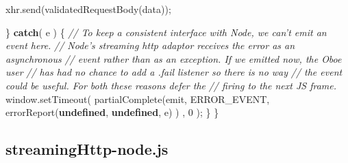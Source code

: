 \documentclass[]{article}
\newenvironment{Shaded}{}{}
\newcommand{\KeywordTok}[1]{\textcolor[rgb]{0.00,0.44,0.13}{\textbf{{#1}}}}
\newcommand{\DecValTok}[1]{\textcolor[rgb]{0.25,0.63,0.44}{{#1}}}
\newcommand{\CommentTok}[1]{\textcolor[rgb]{0.38,0.63,0.69}{\textit{{#1}}}}
\newcommand{\OtherTok}[1]{\textcolor[rgb]{0.00,0.44,0.13}{{#1}}}
\newcommand{\FunctionTok}[1]{\textcolor[rgb]{0.02,0.16,0.49}{{#1}}}
\newcommand{\NormalTok}[1]{{#1}}
\begin{document}
\begin{Shaded}
\begin{Highlighting}[]
      \OtherTok{xhr}\NormalTok{.}\FunctionTok{send}\NormalTok{(}\FunctionTok{validatedRequestBody}\NormalTok{(data));}
      
   \NormalTok{\} }\KeywordTok{catch}\NormalTok{( e ) \{}
      \CommentTok{// To keep a consistent interface with Node, we can't emit an event here.}
      \CommentTok{// Node's streaming http adaptor receives the error as an asynchronous}
      \CommentTok{// event rather than as an exception. If we emitted now, the Oboe user}
      \CommentTok{// has had no chance to add a .fail listener so there is no way}
      \CommentTok{// the event could be useful. For both these reasons defer the}
      \CommentTok{// firing to the next JS frame.  }
      \OtherTok{window}\NormalTok{.}\FunctionTok{setTimeout}\NormalTok{(}
         \FunctionTok{partialComplete}\NormalTok{(emit, ERROR_EVENT, }
             \FunctionTok{errorReport}\NormalTok{(}\KeywordTok{undefined}\NormalTok{, }\KeywordTok{undefined}\NormalTok{, e)}
         \NormalTok{)}
      \NormalTok{,  }\DecValTok{0}
      \NormalTok{);}
   \NormalTok{\}            }
\NormalTok{\}}
\end{Highlighting}
\end{Shaded}

\pagebreak

\subsection{streamingHttp-node.js}

\label{src_streamingHttp-node}
\end{document}
